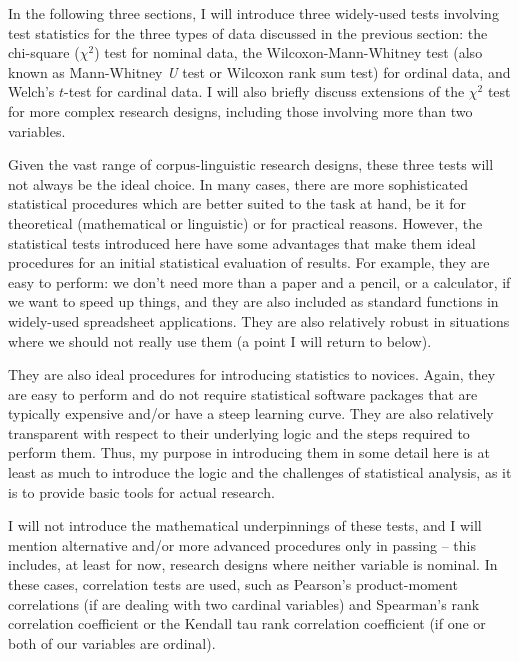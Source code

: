 In the following three sections, I will introduce three widely\hyp{}used tests involving test statistics for the three types of data discussed in the previous section: the chi\hyp{}square ($\chi^2$)  test for nominal  data, the Wilcoxon\hyp{}Mann\hyp{}Whitney  test (also known as Mann\hyp{}Whitney \textit{U} test or Wilcoxon rank sum test) for ordinal  data, and Welch's $t$\hyp{}test  for cardinal  data. I will also briefly discuss extensions of the $\chi^2$ test for more complex research designs,  including those involving more than two variables.

Given the vast range of corpus\hyp{}linguistic research designs,  these three tests will not always be the ideal choice. In many cases, there are more sophisticated statistical procedures which are better suited to the task at hand, be it for theoretical (mathematical or linguistic) or for practical reasons. However, the statistical tests introduced here have some advantages that make them ideal procedures for an initial statistical evaluation of results. For example, they are easy to perform: we don't need more than a paper and a pencil, or a calculator, if we want to speed up things, and they are also included as standard functions in widely\hyp{}used spreadsheet applications. They are also relatively robust in situations where we should not really use them (a point I will return to below).

They are also ideal procedures for introducing statistics  to novices. Again, they are easy to perform and do not require statistical software packages that are typically expensive and\slash or have a steep learning curve. They are also relatively transparent with respect to their underlying logic and the steps required to perform them. Thus, my purpose in introducing them in some detail here is at least as much to introduce the logic and the challenges of statistical analysis, as it is to provide basic tools for actual research.

I will not introduce the mathematical underpinnings of these tests, and I will mention alternative and\slash or more advanced procedures only in passing -- this includes, at least for now, research designs  where neither variable is nominal.  In these cases, correlation  tests are used, such as Pearson's product\hyp{}moment correlations (if are dealing with two cardinal  variables) and Spearman's rank correlation coefficient or the Kendall tau rank correlation coefficient (if one or both of our variables are  ordinal).

